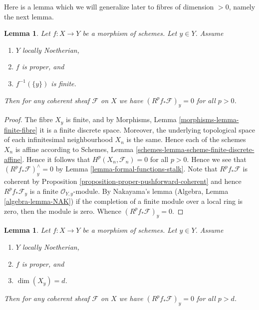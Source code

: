 \documentclass{stacks-project}
\theoremstyle{plain}
\newtheorem{lemma}[subsection]{Lemma}
\theoremstyle{definition}
\theoremstyle{remark}
\numberwithin{equation}{subsection}
\begin{document}
\noindent
Here is a lemma which we will generalize later to fibres of
dimension $ > 0$, namely the next lemma.

\begin{lemma}
\label{lemma-higher-direct-images-zero-finite-fibre}
Let $f : X \to Y$ be a morphism of schemes.
Let $y \in Y$.
Assume
\begin{enumerate}
\item $Y$ locally Noetherian,
\item $f$ is proper, and
\item $f^{-1}(\{y\})$ is finite.
\end{enumerate}
Then for any coherent sheaf $\mathcal{F}$ on $X$ we have
$(R^pf_*\mathcal{F})_y = 0$ for all $p > 0$.
\end{lemma}

\begin{proof}
The fibre $X_y$ is finite, and by
Morphisms, Lemma \ref{morphisms-lemma-finite-fibre} it
is a finite discrete space. Moreover, the underlying topological
space of each infinitesimal neighbourhood $X_n$ is the same.
Hence each of the schemes $X_n$ is affine according to
Schemes, Lemma \ref{schemes-lemma-scheme-finite-discrete-affine}.
Hence it follows that $H^p(X_n, \mathcal{F}_n) = 0$ for all
$p > 0$. Hence we see that $(R^pf_*\mathcal{F})_y^\wedge = 0$
by Lemma \ref{lemma-formal-functions-stalk}.
Note that $R^pf_*\mathcal{F}$ is coherent by
Proposition \ref{proposition-proper-pushforward-coherent} and
hence $R^pf_*\mathcal{F}_y$ is a finite
$\mathcal{O}_{Y, y}$-module. By Nakayama's lemma
(Algebra, Lemma \ref{algebra-lemma-NAK})
if the completion of a finite module over a local ring
is zero, then the module is zero. Whence
$(R^pf_*\mathcal{F})_y = 0$.
\end{proof}

\begin{lemma}
\label{lemma-higher-direct-images-zero-above-dimension-fibre}
Let $f : X \to Y$ be a morphism of schemes.
Let $y \in Y$.
Assume
\begin{enumerate}
\item $Y$ locally Noetherian,
\item $f$ is proper, and
\item $\dim(X_y) = d$.
\end{enumerate}
Then for any coherent sheaf $\mathcal{F}$ on $X$ we have
$(R^pf_*\mathcal{F})_y = 0$ for all $p > d$.
\end{lemma}
\end{document}
